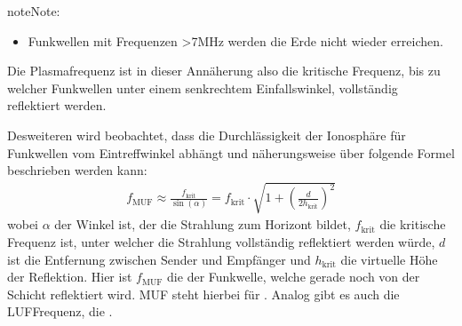 \documentclass[letterpaper,10pt,english]{jupyterBook}
\begin{document}
\begin{sphinxadmonition}{note}{Note:}
\begin{itemize}
\item {} 
\sphinxAtStartPar
Funkwellen mit Frequenzen >7MHz werden die Erde nicht wieder erreichen.

\end{itemize}

\sphinxAtStartPar
Die Plasmafrequenz ist in dieser Annäherung also die kritische Frequenz, bis zu welcher Funkwellen unter einem senkrechtem Einfallswinkel, vollständig reflektiert werden.

\sphinxAtStartPar
Desweiteren wird beobachtet, dass die Durchlässigkeit der Ionosphäre für Funkwellen vom Eintreffwinkel abhängt und näherungsweise über folgende Formel beschrieben werden kann:
\begin{equation*}
\begin{split}f_\mathrm{MUF} \approx \frac{f_\mathrm{krit}}{\sin(\alpha)} = f_\mathrm{krit} \cdot \sqrt{1 + \left(\frac{d}{2 h_\mathrm{krit}}\right)^2}\end{split}
\end{equation*}
\sphinxAtStartPar
wobei \(\alpha\) der Winkel ist, der die Strahlung zum Horizont bildet, \(f_\mathrm{krit}\) die kritische Frequenz ist, unter welcher die Strahlung vollständig reflektiert werden würde, \(d\) ist die Entfernung zwischen Sender und Empfänger und \(h_\mathrm{krit}\) die virtuelle Höhe der Reflektion. Hier ist \(f_\mathrm{MUF}\) die  der Funkwelle, welche gerade noch von der Schicht reflektiert wird. MUF steht hierbei für . Analog gibt es auch die LUF\sphinxhyphen{}Frequenz, die .
\end{sphinxadmonition}
\end{document}
